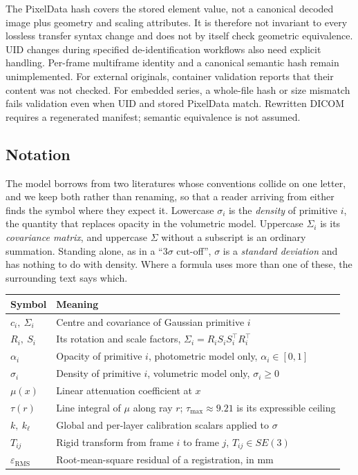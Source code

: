 \documentclass[11pt,a4paper]{article}
\begin{document}
The PixelData hash covers the stored element value, not a canonical decoded image plus
geometry and scaling attributes. It is therefore not invariant to every lossless transfer
syntax change and does not by itself check geometric equivalence. UID changes during
specified de-identification workflows also need explicit handling. Per-frame multiframe
identity and a canonical semantic hash remain unimplemented. For external originals,
container validation reports that their content was not checked. For embedded series, a
whole-file hash or size mismatch fails validation even when UID and stored PixelData
match. Rewritten DICOM requires a regenerated manifest; semantic equivalence is not assumed.

\subsection{Notation}
The model borrows from two literatures whose conventions collide on
one letter, and we keep both rather than renaming, so that a reader arriving from either
finds the symbol where they expect it. Lowercase $\sigma_i$ is the \emph{density} of
primitive $i$, the quantity that replaces opacity in the volumetric model. Uppercase
$\Sigma_i$ is its \emph{covariance matrix}, and uppercase $\Sigma$ without a subscript is
an ordinary summation. Standing alone, as in a ``$3\sigma$ cut-off'', $\sigma$ is a \emph{standard deviation}
and has nothing to do with density. Where a formula uses more than one of these, the surrounding text says which.

\begin{center}
\begin{tabular}{ll}
\toprule
\textbf{Symbol} & \textbf{Meaning}\\
\midrule
$c_i,\ \Sigma_i$ & Centre and covariance of Gaussian primitive $i$\\
$R_i,\ S_i$ & Its rotation and scale factors, $\Sigma_i = R_i S_i S_i^{\!\top} R_i^{\!\top}$\\
$\alpha_i$ & Opacity of primitive $i$, photometric model only, $\alpha_i \in [0,1]$\\
$\sigma_i$ & Density of primitive $i$, volumetric model only, $\sigma_i \ge 0$\\
$\mu(x)$ & Linear attenuation coefficient at $x$\\
$\tau(r)$ & Line integral of $\mu$ along ray $r$; $\tau_{\max}\approx 9.21$ is its
expressible ceiling\\
$k,\ k_\ell$ & Global and per-layer calibration scalars applied to $\sigma$\\
$T_{ij}$ & Rigid transform from frame $i$ to frame $j$, $T_{ij} \in SE(3)$\\
$\varepsilon_{\mathrm{RMS}}$ & Root-mean-square residual of a registration, in mm\\
\bottomrule
\end{tabular}
\end{center}
\end{document}
